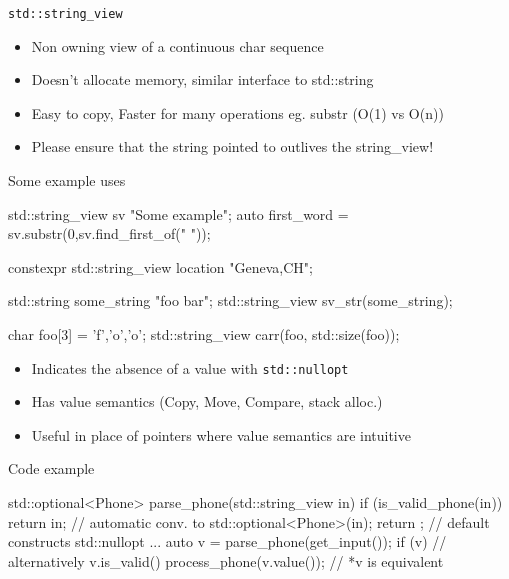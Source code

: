 \begin{frame}[fragile]
  \begin{block}{\texttt{std::string\_view}}
    \begin{itemize}
    \item Non owning view of a continuous char sequence
    \item Doesn't allocate memory, similar interface to std::string
    \item Easy to copy, Faster for many operations eg. substr (O(1) vs O(n))
    \item Please ensure that the string pointed to outlives the string\_view!
    \end{itemize}
    \begin{exampleblock}{Some example uses}
      \begin{cppcode*}{}
        std::string_view sv {"Some example"};
        auto first_word = sv.substr(0,sv.find_first_of(" "));

        constexpr std::string_view location {"Geneva,CH"};

        std::string some_string {"foo bar"};
        std::string_view sv_str(some_string);

        char foo[3] = {'f','o','o'};
        std::string_view carr(foo, std::size(foo));
      \end{cppcode*}
    \end{exampleblock}
  \end{block}
\end{frame}

\begin{frame}[fragile]
  \begin{itemize}
  \item Indicates the absence of a value with \texttt{std::nullopt}
  \item Has value semantics (Copy, Move, Compare, stack alloc.)
  \item Useful in place of pointers where value semantics are intuitive
  \end{itemize}
  \begin{exampleblock}{Code example}
    \begin{cppcode*}{}
      std::optional<Phone> parse_phone(std::string_view in) {
        if (is_valid_phone(in)) {
          return in; // automatic conv. to std::optional<Phone>(in);
        }
        return {}; // default constructs std::nullopt
      }
      ...
      auto v = parse_phone(get_input());
      if (v) {  // alternatively v.is_valid()
        process_phone(v.value()); // *v is equivalent
      }
    \end{cppcode*}
  \end{exampleblock}
\end{frame}

